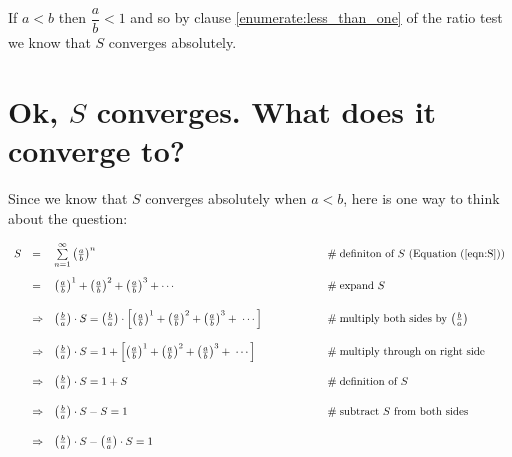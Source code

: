 \documentclass{article}
\theoremstyle{definition}
\begin{document}
\bigskip
\noindent
If $a < b$ then $\dfrac{a}{b} < 1$ and so by clause \ref{enumerate:less_than_one}
of the ratio test we know that $S$ converges absolutely.


\section{Ok, $S$ converges. What does it converge to?}
\label{section:what_does_S_converge_to}

\bigskip
\noindent
Since we know that $S$ converges absolutely when $a < b$,
here is one way to think about the question:  
      
\begin{equation*}
\begin{array}{lllll}
S
&=& \sum\limits_{n = 1}^\infty {\left (\frac{a}{b} \right )}^n
			&\hspace{5em} \mathrel{\#} \text{definiton of $S$ (Equation (\ref{eqn:S}))} \\  
[15pt]
&=& {\left (\frac{a}{b} \right )}^1
        + {\left (\frac{a}{b} \right )}^2 + {\left (\frac{a}{b} \right )}^3 + \cdots
			&\hspace{5em} \mathrel{\#} \text{expand $S$} \\  
[15pt]
&\Rightarrow& \big (\frac{b}{a} \big ) \cdot S = \big (\frac{b}{a} \big ) \cdot \left
        [{\left (\frac{a}{b} \right )}^1 + {\left (\frac{a}{b} \right )}^2 + 
        {\left (\frac{a}{b} \right )}^3 + \; \cdots \right ]
                &\hspace{5em} \mathrel{\#} \text{multiply both sides by 
                                       $\big (\frac{b}{a} \big )$} \\ 
[15pt]
&\Rightarrow& \big (\frac{b}{a} \big ) \cdot S = 1 + \left [{\left (\frac{a}{b} \right )}^1
        + {\left (\frac{a}{b} \right )}^2 + {\left (\frac{a}{b} \right )}^3 + \; \cdots \right ]
                &\hspace{5em}  \mathrel{\#} \text{multiply through on right side} \\
[15pt]
&\Rightarrow&  \big (\frac{b}{a} \big ) \cdot S = 1 + S
                &\hspace{5em}  \mathrel{\#} \text{definition of $S$} \\
[15pt]
&\Rightarrow&  \big (\frac{b}{a} \big ) \cdot S - S = 1
                &\hspace{5em}  \mathrel{\#} \text{subtract $S$ from both sides} \\
[15pt]
&\Rightarrow&  \big (\frac{b}{a} \big ) \cdot S - \left (\frac{a}{a} \right ) \cdot S = 1

\end{array}
\end{equation*}
\end{document}
